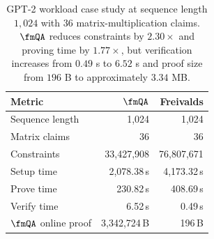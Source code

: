 \begin{table}[t]
\centering
\small
\begin{tabular}{lrr}
\toprule
\textbf{Metric} & \textbf{$\fmQA$} & \textbf{Freivalds} \\
\midrule
Sequence length & 1{,}024 & 1{,}024 \\
Matrix claims & 36 & 36 \\
Constraints & 33{,}427{,}908 & 76{,}807{,}671 \\
Setup time & 2{,}078.38\,s & 4{,}173.32\,s \\
Prove time & 230.82\,s & 408.69\,s \\
Verify time & 6.52\,s & 0.49\,s \\
$\fmQA$ online proof & 3{,}342{,}724\,B & 196\,B \\
\bottomrule
\end{tabular}
\caption{GPT-2 workload case study at sequence length $1{,}024$ with $36$
matrix-multiplication claims. $\fmQA$ reduces constraints by $2.30\times$ and
proving time by $1.77\times$, but verification increases from $0.49$ s to
$6.52$ s and proof size from $196$ B to approximately $3.34$ MB.}
\label{tab:gpt2-case-study}
\end{table}
